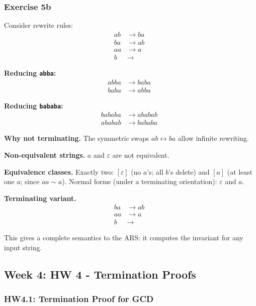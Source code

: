 \documentclass{article}
\theoremstyle{theorem}
\theoremstyle{definition}
\theoremstyle{remark}
\begin{document}
\subsubsection*{Exercise 5b}

Consider rewrite rules:
\begin{align*}
ab &\rightarrow ba \\
ba &\rightarrow ab \\
aa &\rightarrow a \\
b &\rightarrow
\end{align*}

\textbf{Reducing \texttt{abba}:}
\begin{align*}
abba &\rightarrow baba \\
baba &\rightarrow abba
\end{align*}

\textbf{Reducing \texttt{bababa}:}
\begin{align*}
bababa &\rightarrow ababab \\
ababab &\rightarrow bababa
\end{align*}

\textbf{Why not terminating.} The symmetric swaps $ab \leftrightarrow ba$ allow infinite rewriting.

\textbf{Non-equivalent strings.} $a$ and $\varepsilon$ are not equivalent.

\textbf{Equivalence classes.} Exactly two: $[\varepsilon]$ (no $a$'s; all $b$'s delete) and $[a]$ (at least one $a$; since $aa \sim a$).
Normal forms (under a terminating orientation): $\varepsilon$ and $a$.

\textbf{Terminating variant.}
\begin{align*}
ba &\rightarrow ab \\
aa &\rightarrow a \\
b &\rightarrow
\end{align*}


This gives a complete semantics to the ARS: it computes the invariant for any input string.

\subsection{Week 4: HW 4 - Termination Proofs}

\subsubsection{HW4.1: Termination Proof for GCD}
\end{document}
